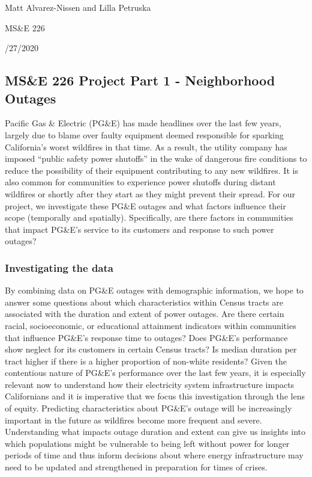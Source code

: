 \documentclass[
]{article}
\author{}
\date{\vspace{-2.5em}}
\begin{document}
\noindent Matt Alvarez-Nissen and Lilla Petruska

\noindent MS\&E 226

/27/2020

\allsectionsfont{\centering}

\hypertarget{mse-226-project-part-1---neighborhood-outages}{%
\subsection{MS\&E 226 Project Part 1 - Neighborhood
Outages}\label{mse-226-project-part-1---neighborhood-outages}}

Pacific Gas \& Electric (PG\&E) has made headlines over the last few
years, largely due to blame over faulty equipment deemed responsible for
sparking California's worst wildfires in that time. As a result, the
utility company has imposed ``public safety power shutoffs'' in the wake
of dangerous fire conditions to reduce the possibility of their
equipment contributing to any new wildfires. It is also common for
communities to experience power shutoffs during distant wildfires or
shortly after they start as they might prevent their spread. For our
project, we investigate these PG\&E outages and what factors influence
their scope (temporally and spatially). Specifically, are there factors
in communities that impact PG\&E's service to its customers and response
to such power outages?

\hypertarget{investigating-the-data}{%
\subsubsection{Investigating the data}\label{investigating-the-data}}

By combining data on PG\&E outages with demographic information, we hope
to answer some questions about which characteristics within Census
tracts are associated with the duration and extent of power outages. Are
there certain racial, socioeconomic, or educational attainment
indicators within communities that influence PG\&E's response time to
outages? Does PG\&E's performance show neglect for its customers in
certain Census tracts? Is median duration per tract higher if there is a
higher proportion of non-white residents? Given the contentious nature
of PG\&E's performance over the last few years, it is especially
relevant now to understand how their electricity system infrastructure
impacts Californians and it is imperative that we focus this
investigation through the lens of equity. Predicting characteristics
about PG\&E's outage will be increasingly important in the future as
wildfires become more frequent and severe. Understanding what impacts
outage duration and extent can give us insights into which populations
might be vulnerable to being left without power for longer periods of
time and thus inform decisions about where energy infrastructure may
need to be updated and strengthened in preparation for times of crises.
\end{document}
